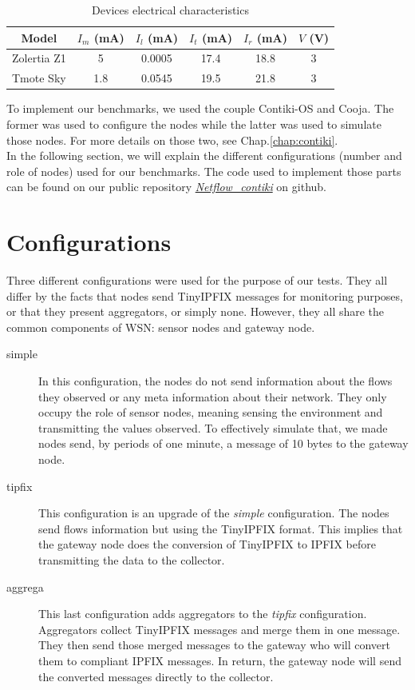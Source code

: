 \begin{table}
  \centering

  \begin{tabular}{|c|c|c|c|c|c|}
    \hline
    Model & $I_m$ (mA) & $I_l$ (mA) & $I_t$ (mA) & $I_r$ (mA) & $V$ (V)\\
    \hline
    Zolertia Z1 & 5 & 0.0005 & 17.4 & 18.8 & 3 \\
    \hline
    Tmote Sky & 1.8 & 0.0545 & 19.5 & 21.8 & 3 \\
    \hline
  \end{tabular}
  \caption{Devices electrical characteristics}
  \label{table:device_consumption}
\end{table}

To implement our benchmarks, we used the couple Contiki-OS and Cooja. The former was used to configure the nodes while the latter was used to simulate those nodes. For more details on those two, see Chap.\ref{chap:contiki}.\\

In the following section, we will explain the different configurations (number and role of nodes) used for our benchmarks. The code used to implement those parts can be found on our public repository \textit{\href{https://github.com/edd19/Netflow_contiki}{Netflow\_contiki}} on github.

\section{Configurations}
Three different configurations were used for the purpose of our tests. They all differ by the facts that nodes send TinyIPFIX messages for monitoring purposes, or that they present aggregators, or simply none. However, they all share the common components of WSN: sensor nodes and gateway node.

\begin{description}
  \item[simple] In this configuration, the nodes do not send information about the flows they observed or any meta information about their network. They only occupy the role of sensor nodes, meaning sensing the environment and transmitting the values observed. To effectively simulate that, we made nodes send, by periods of one minute, a message of 10 bytes to the gateway node.
  \item[tipfix] This configuration is an upgrade of the \textit{simple} configuration. The nodes send flows information but using the TinyIPFIX format. This implies that the gateway node does the conversion of TinyIPFIX to IPFIX before transmitting the data to the collector.
  \item[aggrega] This last configuration adds aggregators to the \textit{tipfix} configuration. Aggregators collect TinyIPFIX messages and merge them in one message. They then send those merged messages to the gateway who will convert them to compliant IPFIX messages. In return, the gateway node will send the converted messages directly to the collector. \\
\end{description}

